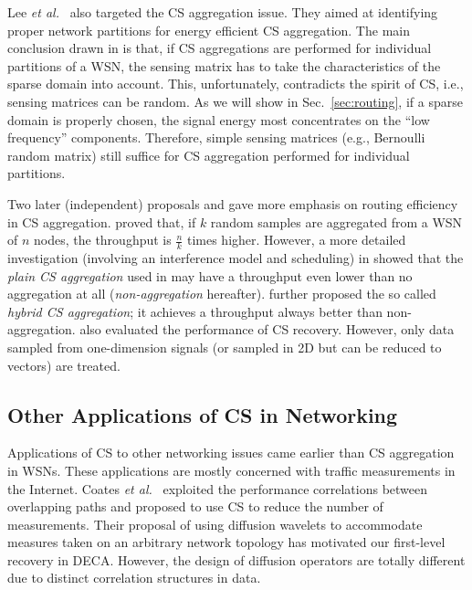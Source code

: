 \documentclass[conference]{IEEEtran}
\begin{document}
    Lee \textit{et al.}\ \cite{LeePSKO-GSN09} also targeted the CS aggregation issue. They aimed at identifying proper network partitions for energy efficient CS aggregation. The main conclusion drawn in \cite{LeePSKO-GSN09} is that, if CS aggregations are performed for individual partitions of a WSN, the sensing matrix has to take the characteristics of the sparse domain into account. This, unfortunately, contradicts the spirit of CS, i.e., sensing matrices can be random. As we will show in Sec.~\ref{sec:routing}, if a sparse domain is properly chosen, the signal energy most concentrates on the ``low frequency'' components. Therefore, simple sensing matrices (e.g., Bernoulli random matrix) still suffice for CS aggregation performed for individual partitions.

    Two later (independent) proposals \cite{LuoWSC-MobiCom09} and \cite{LuoXR-ICC10} gave more emphasis on routing efficiency in CS aggregation. \cite{LuoWSC-MobiCom09} proved that, if $k$ random samples are aggregated from a WSN of $n$ nodes, the throughput is $\frac{n}{k}$ times higher. However, a more detailed investigation (involving an interference model and scheduling) in \cite{LuoXR-ICC10} showed that the \textit{plain CS aggregation} used in \cite{LuoWSC-MobiCom09} may have a throughput even lower than no aggregation at all (\textit{non-aggregation} hereafter). \cite{LuoXR-ICC10} further proposed the so called \textit{hybrid CS aggregation}; it achieves a throughput always better than non-aggregation. \cite{LuoWSC-MobiCom09} also evaluated the performance of CS recovery. However, only data sampled from one-dimension signals (or sampled in 2D but can be reduced to vectors) are treated.

  \subsection{Other Applications of CS in Networking}
Applications of CS to other networking issues came earlier than CS aggregation in WSNs. These applications are mostly concerned with traffic measurements in the Internet. Coates \textit{et al.}\ \cite{CoatesPR-IMC07} exploited the performance correlations between overlapping paths and proposed to use CS to reduce the number of measurements. Their proposal of using diffusion wavelets to accommodate measures taken on an arbitrary network topology has motivated our first-level recovery in DECA. However, the design of diffusion operators are totally different due to distinct correlation structures in data.
\end{document}
